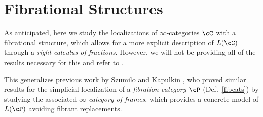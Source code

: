 





\section{Fibrational Structures}

As anticipated, here we study the localizations of $\infty$-categories $\cC$
with a fibrational structure, which allows for a more explicit
description of $L(\cC)$ through a \emph{right calculus of fractions}. However,
we will not be providing all of the results necessary
for this and refer to \cite[Ch.\ 7.2-7.4]{Cis19}.

\noindent
This generalizes
previous work by Szumilo and Kapulkin \cite{Szu14,KS15,Kap17}, who proved
similar results for the simplicial localization of a \emph{fibration category}
$\cP$ (Def.\ \ref{fibcats})
by studying the associated \emph{$\infty$-category of frames}, which provides
a concrete model of $L(\cP)$ avoiding fibrant replacements.

